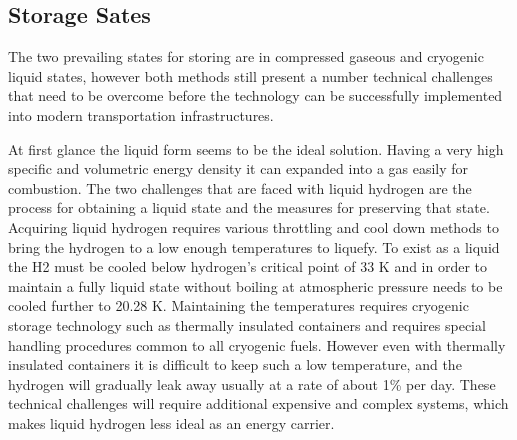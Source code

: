 \documentclass[paper=a4, fontsize=11pt, abstract=on]{scrartcl}
\numberwithin{equation}{section}		%
\numberwithin{figure}{section}			%
\numberwithin{table}{section}				%
\begin{document}
\subsection{Storage Sates}
The two prevailing states for storing are in compressed gaseous and cryogenic liquid states, however both methods still present a number technical challenges that need to be overcome before the technology can be successfully implemented into modern transportation infrastructures. 

At first glance the liquid form seems to be the ideal solution. Having a very high specific and volumetric energy density it can expanded into a gas easily for combustion. The two challenges that are faced with liquid hydrogen are the process for obtaining a liquid state and the measures for preserving that state. Acquiring liquid hydrogen requires various throttling and cool down methods to bring the hydrogen to a low enough temperatures to liquefy. To exist as a liquid the H2 must be cooled below hydrogen's critical point of 33 K and in order to maintain a fully liquid state without boiling at atmospheric pressure needs to be cooled further to 20.28 K. Maintaining the temperatures requires cryogenic storage technology such as thermally insulated containers and requires special handling procedures common to all cryogenic fuels. However even with thermally insulated containers it is difficult to keep such a low temperature, and the hydrogen will gradually leak away usually at a rate of about 1\% per day. These technical challenges will require additional expensive and complex systems, which makes liquid hydrogen less ideal as an energy carrier.
\end{document}
